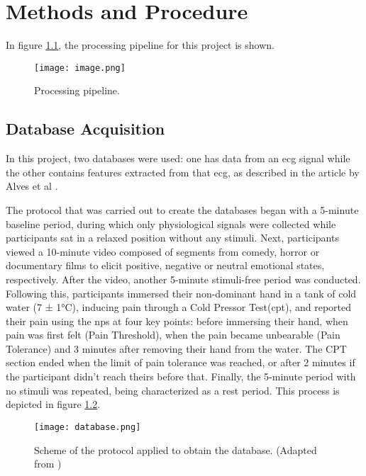 \chapter{Methods and Procedure}
\label{chapter:methods}

In figure \ref{fig:image}, the processing pipeline for this project is shown.

\begin{figure}[h!]
    \centering
    \texttt{[image: image.png]}
    \caption{Processing pipeline.}
    \label{fig:image}
\end{figure}

\section{Database Acquisition}
In this project, two databases were used: one has data from an \ac{ecg} signal while the other contains features extracted from that \ac{ecg}, as described in the article by Alves et al \cite{Alves2024}.

The protocol that was carried out to create the databases began with a 5-minute baseline period, during which only physiological signals were collected while participants sat in a relaxed position without any stimuli. 
Next, participants viewed a 10-minute video composed of segments from comedy, horror or documentary films to elicit positive, negative or neutral emotional states, respectively. 
After the video, another 5-minute stimuli-free period was conducted. 
Following this, participants immersed their non-dominant hand in a tank of cold water (7 ± 1°C), inducing pain through a Cold Pressor Test(\ac{cpt}), and reported their pain using the \ac{nps} at four key points: before immersing their hand, when pain was first felt (Pain Threshold), when the pain became unbearable (Pain Tolerance) and 3 minutes after removing their hand from the water. 
The CPT section ended when the limit of pain tolerance was reached, or after 2 minutes if the participant didn’t reach theirs before that. 
Finally, the 5-minute period with no stimuli was repeated, being characterized as a rest period. 
This process is depicted in figure \ref{fig:database}. 

\begin{figure}[h!]
    \centering
    \texttt{[image: database.png]}
    \caption{Scheme of the protocol applied to obtain the database. (Adapted from \cite{Alves2024})}
    \label{fig:database}
\end{figure}

